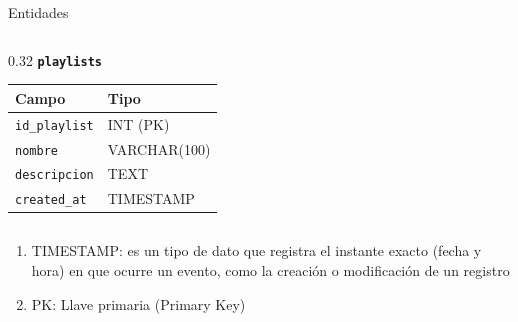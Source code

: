 \documentclass[aspectratio=169, 10pt]{beamer}
\begin{document}
\begin{frame}[t]{Entidades}
\begin{columns}[T]
\begin{column}{0.32\textwidth}
            \vspace{0.25cm}
            \textbf{\texttt{playlists}}\par\vspace{0.05cm}
            \begin{tabular}{ll}
                \toprule
                \textbf{Campo} & \textbf{Tipo} \\
                \midrule
                \texttt{id\_playlist} & INT (PK) \\
                \texttt{nombre} & VARCHAR(100) \\
                \texttt{descripcion} & TEXT \\
                \texttt{created\_at} & TIMESTAMP \\
                \bottomrule
            \end{tabular}
        \end{column}
    \end{columns}
    \vspace{0.5cm}
    \begin{enumerate}
        \item TIMESTAMP: es un tipo de dato que registra el instante exacto (fecha y hora) en que ocurre un evento, como la creación o modificación de un registro
        \item PK: Llave primaria (Primary Key)
    \end{enumerate}
\end{frame}


\end{document}
